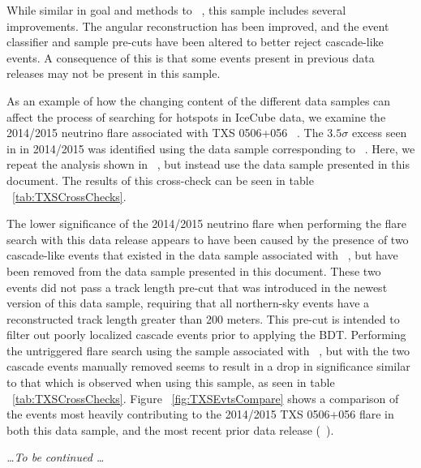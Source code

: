 \documentclass[aps,10pt,prd,twocolumn,floats,letterpaper,showpacs,nofootinbib,bibnotes,notitlepage,superscriptaddress,floatfix]{revtex4-1}
\newcommand{\MA}[1]{{\color{magenta}#1}}
\begin{document}
While similar in goal and methods to ~\cite{IceCube:2019}, this sample includes several improvements. The angular reconstruction has been improved, and the event classifier and sample pre-cuts have been altered to better reject cascade-like events. A consequence of this is that some events present in previous data releases may not be present in this sample.

As an example of how the changing content of the different data samples can affect the process of searching for hotspots in IceCube data, we examine the 2014/2015 neutrino flare associated with TXS 0506+056 ~\cite{IceCube:2018cha}. The $3.5 \sigma$ excess seen in in 2014/2015 was identified using the data sample corresponding to ~\cite{IceCube:2019}. Here, we repeat the analysis shown in ~\cite{IceCube:2018cha}, but instead use the data sample presented in this document. The results of this cross-check can be seen in table ~\ref{tab:TXSCrossChecks}.

The lower significance of the 2014/2015 neutrino flare when performing the flare search with this data release appears to have been caused by the presence of two cascade-like events that existed in the data sample associated with ~\cite{IceCube:2019}, but have been removed from the data sample presented in this document. These two events did not pass a track length pre-cut that was introduced in the newest version of this data sample, requiring that all northern-sky events have a reconstructed track length greater than 200 meters. This pre-cut is intended to filter out poorly localized cascade events prior to applying the BDT. Performing the untriggered flare search using the sample associated with ~\cite{IceCube:2019}, but with the two cascade events manually removed seems to result in a drop in significance similar to that which is observed when using this sample, as seen in table ~\ref{tab:TXSCrossChecks}. Figure ~\ref{fig:TXSEvtsCompare} shows a comparison of the events most heavily contributing to the 2014/2015 TXS 0506+056 flare in both this data sample, and the most recent prior data release (~\cite{IceCube:2019}). 

\MA{\it \ldots To be continued \ldots}
\end{document}
